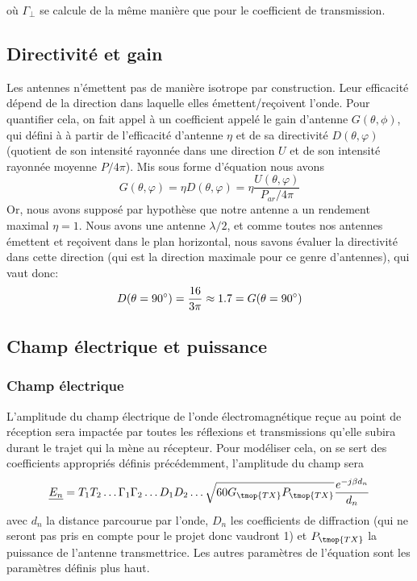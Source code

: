 o{\`u} $\Gamma_{\perp}$ se calcule de la m{\^e}me mani{\`e}re que pour le
coefficient de transmission.

\subsection{Directivit{\'e} et gain}

Les antennes n'{\'e}mettent pas de mani{\`e}re isotrope par construction. Leur
efficacit{\'e} d{\'e}pend de la direction dans laquelle elles
{\'e}mettent/re{\c c}oivent l'onde. Pour quantifier cela, on fait appel {\`a}
un coefficient appel{\'e} le gain d'antenne $G (\theta, \phi)$, qui défini à
{\`a} partir de l'efficacité d'antenne $\eta$ et de sa directivit{\'e} $D (\theta, \varphi)$ (quotient de son intensit{\'e} rayonn{\'e}e
dans une direction $U$ et de son intensit{\'e} rayonn{\'e}e moyenne $P / 4
\pi$). Mis sous forme d'{\'e}quation nous avons
\[ G (\theta, \varphi) = \eta D (\theta, \varphi) = \eta \frac{U (\theta,
   \varphi)}{P_{a r} / 4 \pi} \]
Or, nous avons suppos{\'e} par hypoth{\`e}se que notre antenne a un rendement
maximal $\eta = 1$. Nous avons une antenne $\lambda / 2$, et comme toutes nos
antennes {\'e}mettent et re{\c c}oivent dans le plan horizontal, nous savons
{\'e}valuer la directivit{\'e} dans cette direction (qui est la direction
maximale pour ce genre d'antennes), qui vaut donc:
\[ D (\theta = 90\degree) = \frac{16}{3 \pi} \approx 1.7 = G
   (\theta = 90\degree )\]
   
\subsection{Champ {\'e}lectrique et puissance }

\subsubsection*{Champ électrique}
L'amplitude du champ {\'e}lectrique de l'onde {\'e}lectromagn{\'e}tique re{\c
c}ue au point de r{\'e}ception sera impact{\'e}e par toutes les r{\'e}flexions
et transmissions qu'elle subira durant le trajet qui la m{\`e}ne au
r{\'e}cepteur. Pour mod{\'e}liser cela, on se sert des coefficients
appropri{\'e}s d{\'e}finis pr{\'e}c{\'e}demment, l'amplitude du champ sera
\[ \underline{E_n} = T_1 T_2 \ldots \Gamma_1 \Gamma_2 \ldots D_1 D_2 \ldots
   \sqrt{60 G_{\tmop{TX}} P_{\tmop{TX}}} \frac{e^{- j \beta d_n}}{d_n} \]
avec $d_n$ la distance parcourue par l'onde, $D_n$ les coefficients de
diffraction (qui ne seront pas pris en compte pour le projet donc vaudront 1)
et $P_{\tmop{TX}}$ la puissance de l'antenne transmettrice. Les autres param{\`e}tres de
l'{\'e}quation sont les param{\`e}tres d{\'e}finis plus haut.

